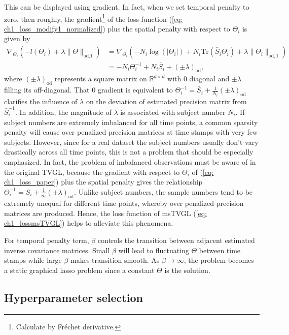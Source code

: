 This can be displayed using gradient. 
In fact, when we set temporal penalty to zero, 
then roughly, the gradient\footnote{Calculate by Fr\'echet derivative.} of the loss function (\ref{eq: ch1_loss_modify1_normalized}) plus the spatial penalty with respect to $\Theta_i$ is given by 
\begin{align*}
    \nabla_{\Theta_i}(-l(\Theta_i)+\lambda\|\Theta\|_{\text{od,1}}) &= \nabla_{\Theta_i}\left(-N_i\log(|\Theta_i|)+N_i\text{Tr}(\bar{S}_i\Theta_i) + \lambda\|\Theta_i\|_{\text{od}, 1}\right) \\
                                  &= -N_i\Theta_i^{-1} + N_i\bar{S}_i + (\pm\lambda)_{\text{od}},
\end{align*}
where $(\pm\lambda)_{\text{od}}$ represents a square matrix on $\mathbb{R}^{d\times d}$ with 0 diagonal and $\pm\lambda$ filling its off-diagonal. 
That 0 gradient is equivalent to $\Theta_i^{-1}=\bar{S}_i+\frac{1}{N_i}(\pm\lambda)_{\text{od}}$  
clarifies the influence of $\lambda$ on the deviation of estimated precision matrix from $\bar{S}_i^{-1}$.
In addition, the magnitude of $\lambda$ is associated with subject number $N_i$. 
If subject numbers are extremely imbalanced for all time points, 
a common sparsity penalty will cause over penalized precision matrices at time stamps with very few subjects. 
However, since for a real dataset the subject numbers usually don't vary drastically across all time points, 
this is not a problem that should be especially emphasized. 
In fact, the problem of imbalanced observations must be aware of in the original TVGL, 
because the gradient with respect to $\Theta_i$ of (\ref{eq: ch1_loss_paper}) plus the spatial penalty gives the relationship $\Theta_i^{-1}=S_i+\frac{1}{n_i}(\pm\lambda)_{\text{od}}$. 
Unlike subject numbers, the sample numbers tend to be extremely unequal for different time points, 
whereby over penalized precision matrices are produced. 
Hence, the loss function of msTVGL (\ref{eq: ch1_lossmsTVGL}) helps to alleviate this phenomena. 

For temporal penalty term, $\beta$ controls the transition between adjacent estimated inverse covariance matrices. 
Small $\beta$ will lead to fluctuating $\Theta$ between time stamps 
while large $\beta$ makes transition smooth. 
As $\beta\rightarrow\infty$, 
the problem becomes a static graphical lasso problem since a constant $\Theta$ is the solution.

\subsection{Hyperparameter selection}

